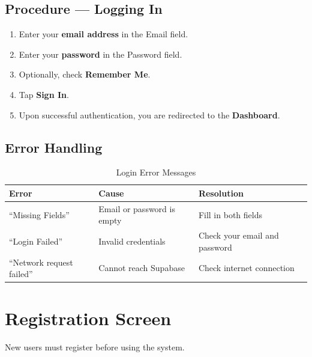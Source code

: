 \documentclass[10pt, a4paper, oneside]{report}
\begin{document}
\subsection*{Procedure --- Logging In}
\begin{enumerate}[leftmargin=*, nosep]
  \item Enter your \textbf{email address} in the Email field.
  \item Enter your \textbf{password} in the Password field.
  \item Optionally, check \textbf{Remember Me}.
  \item Tap \textbf{Sign In}.
  \item Upon successful authentication, you are redirected to the \textbf{Dashboard}.
\end{enumerate}

\subsection*{Error Handling}
\begin{table}[H]
\centering
\caption{Login Error Messages}
\label{tab:login-errors}
\begin{tabularx}{\textwidth}{l l X}
  \toprule
  \textbf{Error} & \textbf{Cause} & \textbf{Resolution} \\
  \midrule
  ``Missing Fields''         & Email or password is empty      & Fill in both fields \\
  ``Login Failed''           & Invalid credentials             & Check your email and password \\
  ``Network request failed'' & Cannot reach Supabase           & Check internet connection \\
  \bottomrule
\end{tabularx}
\end{table}

\section{Registration Screen}
\label{sec:registration}

New users must register before using the system.
\end{document}
